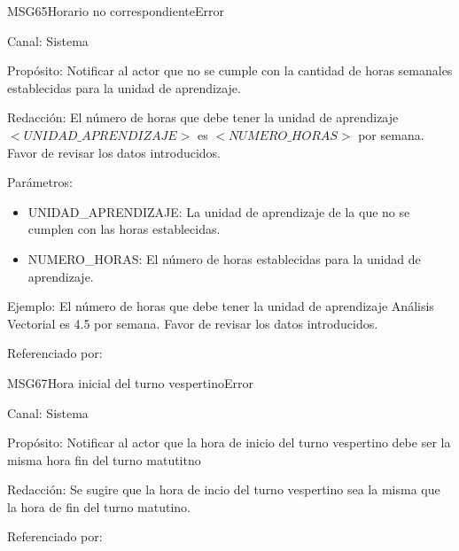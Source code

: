\begin{mensaje}{MSG65}{Horario no correspondiente}{Error}
	\item[Canal:] Sistema
	\item[Propósito:] Notificar al actor que no se cumple con la cantidad de horas semanales establecidas para la unidad de aprendizaje.
	\item[Redacción:] El número de horas que debe tener la unidad de aprendizaje $<UNIDAD\_APRENDIZAJE>$ es $<NUMERO\_HORAS>$ por semana. Favor de revisar los datos introducidos.
	\item[Parámetros:] \cdtEmpty
	\begin{itemize}
		\item UNIDAD\_APRENDIZAJE: La unidad de aprendizaje de la que no se cumplen con las horas establecidas.
		\item NUMERO\_HORAS: El número de horas establecidas para la unidad de aprendizaje.
	\end{itemize}
	\item[Ejemplo:] El número de horas que debe tener la unidad de aprendizaje Análisis Vectorial es 4.5 por semana. Favor de revisar los datos introducidos.
	\item[Referenciado por: ] 
\end{mensaje}



\begin{mensaje}{MSG67}{Hora inicial del turno vespertino}{Error}
	\item[Canal:] Sistema
	\item[Propósito:] Notificar al actor que la hora de inicio del turno vespertino debe ser la misma hora fin del turno matutitno
	\item[Redacción:] Se sugire que la hora de incio del turno vespertino sea la misma que la hora de fin del turno matutino.
	\item[Referenciado por: ] 
\end{mensaje}